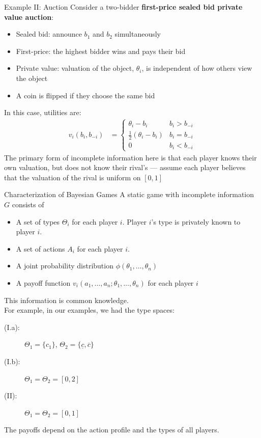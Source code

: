 \documentclass[10pt]{extarticle}
\begin{document}
  \begin{problem}{Example II: Auction}
    Consider a two-bidder \textbf{first-price sealed bid private value auction}:
    \begin{itemize}
      \item Sealed bid: announce $b_1$ and $b_2$ simultaneously
      \item First-price: the highest bidder wins and pays their bid
      \item Private value: valuation of the object, $\theta_i$, is independent of how others view the object
      \item A coin is flipped if they choose the same bid
    \end{itemize}
    In this case, utilities are:
    \begin{align*}
      v_i(b_i,b_{-i}) &= \begin{cases}
        \theta_i - b_i & b_i > b_{-i}\\
        \frac{1}{2}(\theta_i-b_i) & b_i = b_{-i}\\
        0 & b_i < b_{-i}
      \end{cases}
    \end{align*}
    The primary form of incomplete information here is that each player knows their own valuation, but does not know their rival's --- assume each player believes that the valuation of the rival is uniform on $[0,1]$
  \end{problem}
  \begin{problem}{Characterization of Bayesian Games}
    A static game with incomplete information $G$ consists of
    \begin{itemize}
      \item A set of types $\Theta_i$ for each player $i$. Player $i$'s type is privately known to player $i$.
      \item A set of actions $A_i$ for each player $i$.
      \item A joint probability distribution $\phi(\theta_1,\dots,\theta_n)$
      \item A payoff function $v_i(a_1,\dots,a_n;\theta_1,\dots,\theta_n)$ for each player $i$
    \end{itemize}
    This information is common knowledge.\\

    For example, in our examples, we had the type spaces:
    \begin{description}
      \item[(I.a):] $\Theta_1 = \{c_1\}$, $\Theta_2 = \{\underline{c},\overline{c}\}$
      \item[(I.b):] $\Theta_1=\Theta_2 = [0,2]$
      \item[(II):] $\Theta_1 = \Theta_2 = [0,1]$
    \end{description}
    The payoffs depend on the action profile and the types of all players.
  \end{problem}
\end{document}
